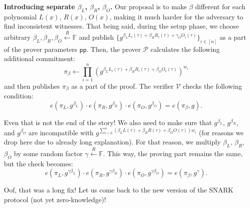 \documentclass[../lecture-notes-148x210.tex]{subfiles}
\begin{document}
\textbf{Introducing separate $\beta_L$, $\beta_R$, $\beta_O$.} Our proposal is to make $\beta$ different for each polynomial $L(x)$, $R(x)$, $O(x)$, making it much harder for the adversary to find inconsistent witnesses. That being said, during the setup phase, we choose arbitrary $\beta_L,\beta_R,\beta_O \xleftarrow{R} \mathbb{F}$ and publish $\{g^{\beta_LL_i(\tau)+\beta_RR_i(\tau)+\gamma_OO_i(\tau)}\}_{i \in [n]}$ as a part of the prover parameters $\mathsf{pp}$. Then, the prover $\mathcal{P}$ calculates the following additional commitment:
\begin{equation*}
    \pi_{\beta} \gets \prod_{i=1}^n (g^{\beta_LL_i(\tau) + \beta_RR_i(\tau) + \beta_OO_i(\tau)})^{w_i}
\end{equation*}
and then publishes $\pi_{\beta}$ as a part of the proof. The verifier $\mathcal{V}$ checks the following condition:
\begin{equation*}
    e(\pi_L, g^{\beta_L}) \cdot e(\pi_R, g^{\beta_R}) \cdot e(\pi_O, g^{\beta_O}) = e(\pi_{\beta}, g).
\end{equation*}

Even that is not the end of the story! We also need to make sure that $g^{\beta_L}$, $g^{\beta_R}$, and $g^{\beta_O}$ are incompatible with $g^{\sum_{i=0}^n (\beta_LL(\tau) + \beta_RR(\tau) + \beta_OO(\tau))w_i}$ (for reasons we drop here due to already long explanation). For that reason, we multiply $\beta_L$, $\beta_R$, $\beta_O$ by some random factor $\gamma \xleftarrow{R} \mathbb{F}$. This way, the proving part remains the same, but the check becomes:
\begin{equation*}
    e(\pi_L, g^{\gamma\beta_L}) \cdot e(\pi_R, g^{\gamma\beta_R}) \cdot e(\pi_O, g^{\gamma\beta_O}) = e(\pi_{\beta}, g^{\gamma}).
\end{equation*}

Oof, that was a long fix! Let us come back to the new version of the SNARK protocol (not yet zero-knowledge)!
\end{document}
